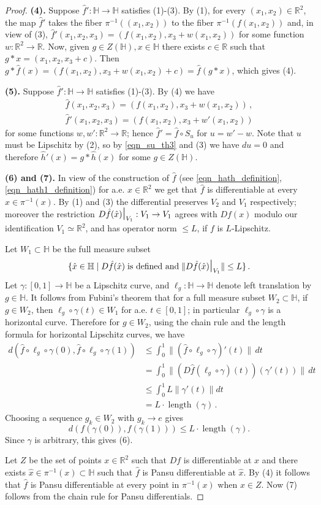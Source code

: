 \documentclass[titlepage]{amsart}
\numberwithin{equation}{section}
\theoremstyle{plain}
\theoremstyle{definition}
\theoremstyle{remark}
\newcommand{\ga}{\gamma}
\renewcommand{\H}{\mathbb{H}}
\newcommand{\length}{\operatorname{length}}
\newcommand{\R}{\mathbb{R}}
\newcommand{\ra}{\rightarrow}
\newcommand{\restr}{\mbox{\Large \(|\)\normalsize}}
\begin{document}
\begin{proof}
{\bf(4).}  Suppose $\hat f':\H\ra\H$ satisfies (1)-(3). By (1), for every $(x_1,x_2)\in\R^2$, the map $\hat f'$ takes the fiber $\pi^{-1}((x_1,x_2))$ to the fiber $\pi^{-1}(f(x_1,x_2))$ and, in view of (3), $\hat f'(x_1,x_2,x_3)=(f(x_1,x_2),x_3+w(x_1,x_2))$ for some function $w:\R^2\to\R$. Now, given $g\in Z(\H), x\in \H$ there exists $c\in \R$ such that $g*x=(x_1,x_2,x_3+c)$. Then $g*\hat f(x)=(f(x_1,x_2),x_3+w(x_1,x_2)+c)=\hat f(g*x)$, which gives (4). 

{\bf(5).}  Suppose $\hat f':\H\ra\H$ satisfies (1)-(3).  By (4) we have 
\begin{align*}
\hat f(x_1,x_2,x_3)=(f(x_1,x_2),x_3+w(x_1,x_2))\,,\\
\hat f'(x_1,x_2,x_3)=(f(x_1,x_2),x_3+w'(x_1,x_2))
\end{align*}
for some functions $w,w':\R^2\ra\R$; hence $\hat f'=\hat f\circ  S_u$ for $u=w'-w$.
Note that $u$ must be Lipschitz by (2), so by \eqref{eqn_su_th3} and (3) we have $du=0$ and  therefore $\hat h'(x)= g*\hat h(x)$ for some $g\in Z(\H)$.

{\bf (6) and (7).}  In view of the construction of $\hat f$ (see \eqref{eqn_hath_definition}, \eqref{eqn_hath1_definition}) for a.e. $x\in \R^2$ we get that $\hat f$ is differentiable at every $\hat x\in \pi^{-1}(x)$.  By (1) and (3)  the differential preserves $V_2$ and $V_1$ respectively; moreover the restriction $D\hat f(\hat x)\restr_{V_1}:V_1\ra V_1$ agrees with $Df(x)$ modulo our identification $V_1\simeq\R^2$, and has operator norm $\leq L$, if $f$ is $L$-Lipschitz.  

Let $W_1\subset\H$ be the full measure subset   
$$
\{ \hat{x}\in  \H\mid D\hat{f}(\hat{x})\;\text{is defined and}\;\|D\hat{f}(\hat{x})\restr_{V_1}\|\leq L\}\,.
$$ 
Let $\ga:[0,1]\ra \H$ be a Lipschitz curve, and $\ell_g:\H\ra\H$ denote left translation by $g\in\H$.  It follows from Fubini's theorem that for a full measure subset $W_2\subset \H$, if $g\in  W_2$, then  $\ell_g\circ\ga(t)\in W_1$ for a.e. $t\in [0,1]$; in particular $\ell_g\circ \ga$ is a horizontal curve.   Therefore for $g\in  W_2$, using the chain rule and the length formula for horizontal Lipschitz curves, we have
\begin{align*}
d(\hat{f}\circ\ell_g\circ\ga(0),\hat{f}\circ\ell_g\circ\ga(1))&\leq \int_0^1 \|(\hat{f}\circ\ell_g\circ\ga)'(t)\|\,dt\\
&= \int_0^1 \|(D\hat{f}(\ell_g\circ\ga)(t))(\ga'(t))\|\,dt\\
&\leq \int_0^1L\|\ga'(t)\|dt\\
&=L\cdot\length(\ga)\,.
\end{align*}
Choosing a sequence $g_k\in  W_2$ with $g_k\ra e$ gives 
$$
d(f(\ga(0)),f(\ga(1)))\leq L\cdot\length(\ga).
$$
Since $\ga$ is arbitrary, this gives (6).  

Let $Z$ be the set of points $x\in \R^2$ such that $Df$ is differentiable at $x$ and there exists $\hat x\in \pi^{-1}(x)\subset\H$ such that $\hat f$ is Pansu differentiable at $\hat x$.  By (4) it follows that $\hat f$ is Pansu differentiable at every point in $\pi^{-1}(x)$ when $x\in Z$.  Now (7) follows from the chain rule for Pansu differentials. 
\end{proof}
\end{document}
